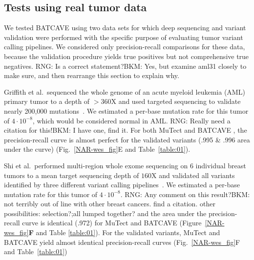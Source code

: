 \documentclass[a4,center,fleqn]{NAR}
\newcommand{\rngcomment}[1]{{\color{red}RNG: #1}}
\newcommand{\bkmcomment}[1]{{\color{blue}BKM: #1}}
\newcommand{\batcave}{BATCAVE }
\begin{document}
\subsection{Tests using real tumor data}
We tested \batcave using two data sets for which deep sequencing and variant validation were performed with the specific purpose of evaluating tumor variant calling pipelines.
We considered only precision-recall comparisons for these data, because the validation procedure yields true positives but not comprehensive true negatives. \rngcomment{Is  a correct statement?}\bkmcomment{Yes, but examine aml31 closely to make sure, and then rearrange this section to explain why.}

Griffith et al.\ sequenced the whole genome of an acute myeloid leukemia (AML) primary tumor to a depth of $>$360X and used targeted sequencing to validate nearly 200,000 mutations~\cite{Griffith2015}.
We estimated a per-base mutation rate for this tumor of $4\cdot10^{-8}$, which would be considered normal in AML. \rngcomment{Really need a citation for this!}\bkmcomment{I have one, find it.}
For both MuTect and \batcave, the precision-recall curve is almost perfect for the validated variants (.995 \& .996 area under the curve) (Fig.~\ref{NAR-wes_fig}E and Table~\ref{table:01}).

Shi et al.\ performed multi-region whole exome sequencing on 6 individual breast tumors to a mean target sequencing depth of $160\mathrm{X}$ and validated all variants identified by three different variant calling pipelines~\cite{Shi2018}.
We estimated a per-base mutation rate for this tumor of $4\cdot10^{-8}$. \rngcomment{Any comment on this result?}\bkmcomment{not terribly out of line with other breast cancers. find a citation. other possibilities: selection?;all lumped together?}
and the area under the precision-recall curve is identical (.972) for MuTect and \batcave (Figure~\ref{NAR-wes_fig}\textbf{F} and Table \ref{table:01}).
For the validated variants, MuTect and \batcave yield almost identical precision-recall curves (Fig.~\ref{NAR-wes_fig}F and Table~\ref{table:01})
\end{document}
